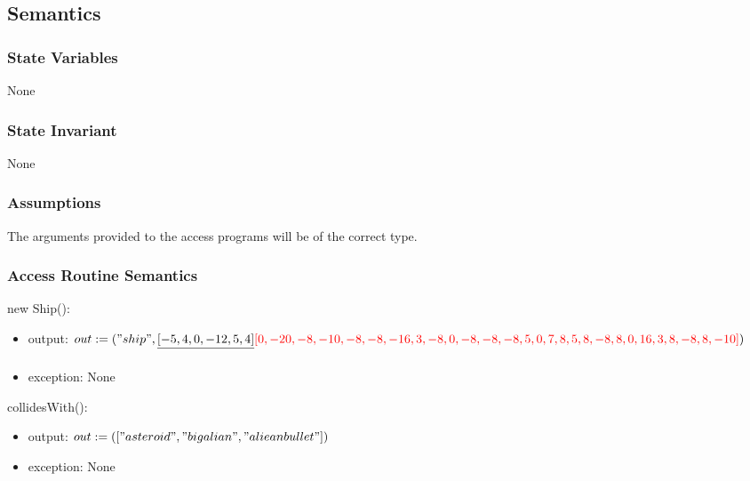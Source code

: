 \documentclass[12pt]{article}
\begin{document}
\subsection* {Semantics}

\subsubsection* {State Variables}
None


\subsubsection* {State Invariant}
None

\subsubsection* {Assumptions}

The arguments provided to the access programs will be of the correct type.

\subsubsection* {Access Routine Semantics}

\noindent new Ship():
\begin{itemize}
\item output: $out := ("ship",\sout{[-5,4,0,-12,5,4]} \textcolor{red}{[0, -20, -8, -10, -8, -8, -16, 3, -8, 0, -8, -8, -8, 5, 
    0, 7, 
    8, 5, 8, -8, 8, 0, 16, 3, 8, -8, 8, -10]})$
\item exception: None
\end{itemize}

\noindent collidesWith():
\begin{itemize}
\item output: $out := (["asteroid","bigalian","alieanbullet"])$
\item exception: None
\end{itemize}
\end{document}

